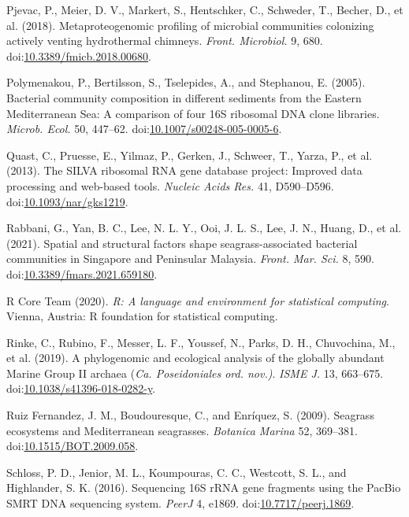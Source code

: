 \documentclass[12pt,]{article}
\begin{document}
\leavevmode\hypertarget{ref-Pjevac2018b}{}%
Pjevac, P., Meier, D. V., Markert, S., Hentschker, C., Schweder, T.,
Becher, D., et al. (2018). Metaproteogenomic profiling of microbial
communities colonizing actively venting hydrothermal chimneys.
\emph{Front. Microbiol.} 9, 680.
doi:\href{https://doi.org/10.3389/fmicb.2018.00680}{10.3389/fmicb.2018.00680}.

\leavevmode\hypertarget{ref-Polymenakou2005a}{}%
Polymenakou, P., Bertilsson, S., Tselepides, A., and Stephanou, E.
(2005). Bacterial community composition in different sediments from the
Eastern Mediterranean Sea: A comparison of four 16S ribosomal DNA clone
libraries. \emph{Microb. Ecol.} 50, 447--62.
doi:\href{https://doi.org/10.1007/s00248-005-0005-6}{10.1007/s00248-005-0005-6}.

\leavevmode\hypertarget{ref-Quast2013b}{}%
Quast, C., Pruesse, E., Yilmaz, P., Gerken, J., Schweer, T., Yarza, P.,
et al. (2013). The SILVA ribosomal RNA gene database project: Improved
data processing and web-based tools. \emph{Nucleic Acids Res.} 41,
D590--D596.
doi:\href{https://doi.org/10.1093/nar/gks1219}{10.1093/nar/gks1219}.

\leavevmode\hypertarget{ref-Rabbani2021}{}%
Rabbani, G., Yan, B. C., Lee, N. L. Y., Ooi, J. L. S., Lee, J. N.,
Huang, D., et al. (2021). Spatial and structural factors shape
seagrass-associated bacterial communities in Singapore and Peninsular
Malaysia. \emph{Front. Mar. Sci.} 8, 590.
doi:\href{https://doi.org/10.3389/fmars.2021.659180}{10.3389/fmars.2021.659180}.

\leavevmode\hypertarget{ref-RCoreTeam2020}{}%
R Core Team (2020). \emph{R: A language and environment for statistical
computing}. Vienna, Austria: R foundation for statistical computing.

\leavevmode\hypertarget{ref-Rinke2019}{}%
Rinke, C., Rubino, F., Messer, L. F., Youssef, N., Parks, D. H.,
Chuvochina, M., et al. (2019). A phylogenomic and ecological analysis of
the globally abundant Marine Group II archaea (\emph{Ca.
\textup{Poseidoniales ord. nov.)}}. \emph{ISME J.} 13, 663--675.
doi:\href{https://doi.org/10.1038/s41396-018-0282-y}{10.1038/s41396-018-0282-y}.

\leavevmode\hypertarget{ref-RuizFernandez2009}{}%
Ruiz Fernandez, J. M., Boudouresque, C., and Enríquez, S. (2009).
Seagrass ecosystems and Mediterranean seagrasses. \emph{Botanica Marina}
52, 369--381.
doi:\href{https://doi.org/10.1515/BOT.2009.058}{10.1515/BOT.2009.058}.

\leavevmode\hypertarget{ref-Schloss2016}{}%
Schloss, P. D., Jenior, M. L., Koumpouras, C. C., Westcott, S. L., and
Highlander, S. K. (2016). Sequencing 16S rRNA gene fragments using the
PacBio SMRT DNA sequencing system. \emph{PeerJ} 4, e1869.
doi:\href{https://doi.org/10.7717/peerj.1869}{10.7717/peerj.1869}.
\end{document}

